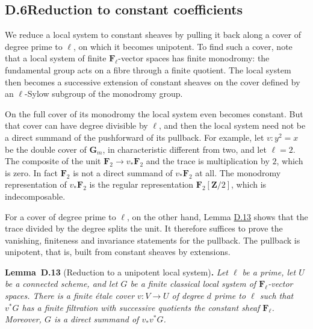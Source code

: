 \documentclass[11pt]{article}
\newenvironment{bpstatement}[2]{\par\addvspace{0.6\baselineskip}\noindent\textbf{#1}#2\textbf{.}\enspace\ignorespaces}
  {\par\addvspace{0.4\baselineskip}}
\newenvironment{bpstatementit}[2]{\begin{bpstatement}{#1}{#2}\itshape\ignorespaces}{\end{bpstatement}}
\begin{document}
\subsection*{\texorpdfstring{D.6\quad Reduction to constant coefficients}{D.6 Reduction to constant coefficients}}
\label{bp44}%
\label{bp45}%
We reduce a local system to constant sheaves by pulling it back along a cover of degree prime to \(\ell\), on which it becomes unipotent. To find such a cover, note that a local system of finite \(\mathbf F_\ell\)-vector spaces has finite monodromy: the fundamental group acts on a fibre through a finite quotient. The local system then becomes a successive extension of constant sheaves on the cover defined by an \(\ell\)-Sylow subgroup of the monodromy group.

On the full cover of its monodromy the local system even becomes constant. But that cover can have degree divisible by \(\ell\), and then the local system need not be a direct summand of the pushforward of its pullback. For example, let \(v:y^2=x\) be the double cover of \(\mathbf G_m\), in characteristic different from two, and let \(\ell=2\). The composite of the unit \(\mathbf F_2\to v_*\mathbf F_2\) and the trace is multiplication by \(2\), which is zero. In fact \(\mathbf F_2\) is not a direct summand of \(v_*\mathbf F_2\) at all. The monodromy representation of \(v_*\mathbf F_2\) is the regular representation \(\mathbf F_2[\mathbf Z/2]\), which is indecomposable.

For a cover of degree prime to \(\ell\), on the other hand, Lemma \hyperref[bp46]{D.13} shows that the trace divided by the degree splits the unit. It therefore suffices to prove the vanishing, finiteness and invariance statements for the pullback. The pullback is unipotent, that is, built from constant sheaves by extensions.

\label{bp46}%
\begin{bpstatementit}{Lemma~D.13}{ (Reduction to a unipotent local system)}
Let \(\ell\) be a prime, let \(U\) be a connected scheme, and let \(G\) be a finite classical local system of \(\mathbf F_\ell\)-vector spaces.  There is a finite étale cover \(v:V\to U\) of degree \(d\) prime to \(\ell\) such that \(v^*G\) has a finite filtration with successive quotients the constant sheaf \(\mathbf F_\ell\).  Moreover, \(G\) is a direct summand of \(v_*v^*G\).
\end{bpstatementit}
\end{document}
